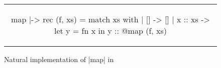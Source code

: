 \begin{figure}[tp]
\begin{tabular}{c}
\begin{Datalang}
map |-> rec (f, xs) =
  match xs with
  | [] ->
      []
  | x :: xs ->
      let y = fn x in
      y :: @map (f, xs)
\end{Datalang}
\end{tabular}
\caption{Natural implementation of \datalang|map| in \DataLang}
\label{fig:map}
\end{figure}